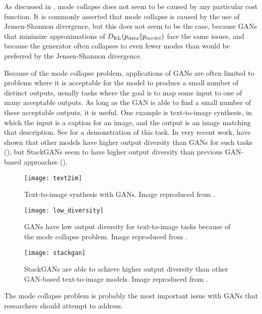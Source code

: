 As discussed in , mode collapse does not seem to be
caused by any particular cost function.
It is commonly asserted that mode collapse is caused by the use of Jensen-Shannon
divergence, but this does not seem to be the case, because GANs that minimize
approximations of $D_{\mathrm{KL}}(p_{\rm{data}} \Vert p_{\rm{model}})$ face the same issues, and because
the generator often collapses to even fewer modes than would be preferred by the
Jensen-Shannon divergence.

Because of the mode collapse problem, applications of GANs are often limited to
problems where it is acceptable for the model to produce a small number of 
distinct outputs, usually tasks where the goal is to map some input to one of
many acceptable outputs.
As long as the GAN is able to find a small number of these acceptable outputs,
it is useful.
One example is text-to-image synthesis, in which the input is a caption for an
image, and the output is an image matching that description.
See  for a demonstration of this task.
In very recent work, \citet{reedgenerating} have shown that other models have
higher output diversity than GANs for such tasks (),
but StackGANs \citep{zhang2016stackgan} seem to have higher output diversity than previous GAN-based
approaches ().


\begin{figure}
\centering
\texttt{[image: text2im]}
\caption{
Text-to-image synthesis with GANs.
Image reproduced from \citet{reed2016generative}.
}
\label{fig:text2im}
\end{figure}

\begin{figure}
  \centering
  \texttt{[image: low\_diversity]}
  \caption{GANs have low output diversity for text-to-image
    tasks because of the mode collapse problem.
    Image reproduced from \citet{reedgenerating}.
  }
  \label{fig:low_diversity}
\end{figure}

\begin{figure}
  \centering
  \texttt{[image: stackgan]}
  \caption{StackGANs are able to achieve higher output
    diversity than other GAN-based text-to-image models.
    Image reproduced from \citet{zhang2016stackgan}.}
    \label{fig:stackgan}
  \end{figure}

The mode collapse problem is probably the most important issue with GANs that
researchers should attempt to address.

